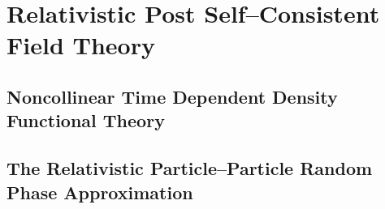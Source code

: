 \chapter{Relativistic Post Self--Consistent Field Theory}

\section{Noncollinear Time Dependent Density Functional Theory}
\section{The Relativistic Particle--Particle Random Phase Approximation}

